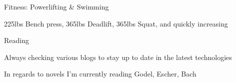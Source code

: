 

\begin{cventries}

  \cventry
    {Fitness: Powerlifting \& Swimming} %
    {} %
    {} %
    {} %
    {
      \begin{cvitems} %
        \item {225lbs Bench press, 365lbs Deadlift, 365lbs Squat, and quickly increasing}
        \item {}
      \end{cvitems}
    }

  \cventry
    {Reading} %
    {} %
    {} %
    {} %
    {
      \begin{cvitems} %
        \item {Always checking various blogs to stay up to date in the latest technologies}
        \item {In regards to novels I'm currently reading Godel, Escher, Bach}
        \item {}
        \item {}
      \end{cvitems}
    }
\end{cventries}
